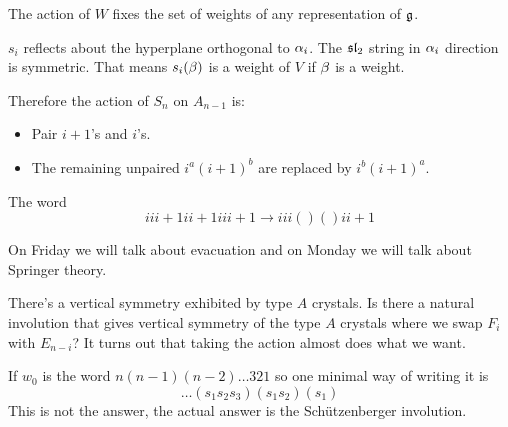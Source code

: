 \documentclass[12pt]{memoir}
\begin{document}
\begin{Lem}
    The action of $W$ fixes the set of weights of any representation of $\mathfrak{g}$.
\end{Lem}

\begin{ptcbp}
    $s_i$ reflects about the hyperplane orthogonal to $\alpha_i$. The $\mathfrak{sl}_2$ string in $\alpha_i$ direction is symmetric. That means $s_i(\beta)$ is a weight of $V$ if $\beta$ is a weight.
\end{ptcbp}

Therefore the action of $S_n$ on $A_{n-1}$ is:

\begin{itemize}
    \item Pair $i+1$'s and $i$'s.
    \item The remaining unpaired $i^a(i+1)^b$ are replaced by $i^b(i+1)^a$.
\end{itemize}

The word 
$$iii+1ii+1iii+1\to iii()()ii+1$$

On Friday we will talk about evacuation and on Monday we will talk about Springer theory.\par

There's a vertical symmetry exhibited by type $A$ crystals. Is there a natural involution that gives vertical symmetry of the type $A$ crystals where we swap $F_i$ with $E_{n-i}$? It turns out that taking the action almost does what we want.\par
If $w_0$ is the word $n(n-1)(n-2)\dots321$ so one minimal way of writing it is 
$$\dots(s_1s_2s_3)(s_1s_2)(s_1)$$
This is not the answer, the actual answer is the Schützenberger involution.

\ifx\nextra\undefined
\printindex
\else\fi
\nocite{*}


\end{document}
